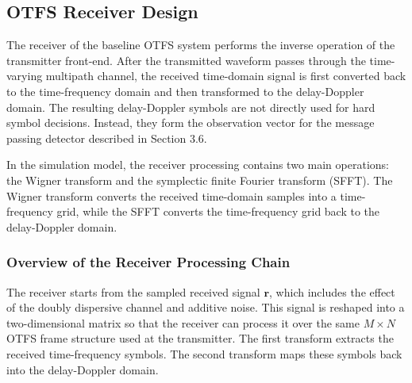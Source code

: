 \subsection{OTFS Receiver Design}

The receiver of the baseline OTFS system performs the inverse operation of the transmitter front-end. After the transmitted waveform passes through the time-varying multipath channel, the received time-domain signal is first converted back to the time-frequency domain and then transformed to the delay-Doppler domain. The resulting delay-Doppler symbols are not directly used for hard symbol decisions. Instead, they form the observation vector for the message passing detector described in Section 3.6.

In the simulation model, the receiver processing contains two main operations: the Wigner transform and the symplectic finite Fourier transform (SFFT). The Wigner transform converts the received time-domain samples into a time-frequency grid, while the SFFT converts the time-frequency grid back to the delay-Doppler domain.

\subsubsection{Overview of the Receiver Processing Chain}

The receiver starts from the sampled received signal \(\mathbf{r}\), which includes the effect of the doubly dispersive channel and additive noise. This signal is reshaped into a two-dimensional matrix so that the receiver can process it over the same \(M \times N\) OTFS frame structure used at the transmitter. The first transform extracts the received time-frequency symbols. The second transform maps these symbols back into the delay-Doppler domain.

